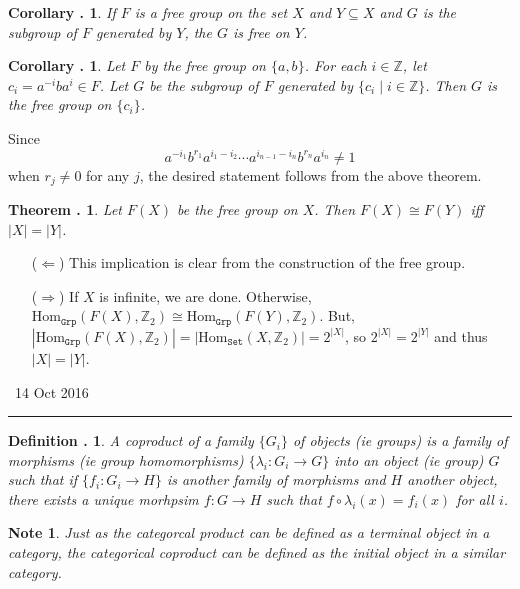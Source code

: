\documentclass[twoside]{report}
\newcommand{\Hom}{\textrm{Hom}}
\newcommand{\Z}{\mathbb{Z}}
\newcommand{\cat}[1]{\texttt{#1}}
\newcounter{Lecture}
\newcommand{\newLec}[1]{
  \stepcounter{Lecture}
  \noindent{\Large\bf Lecture \arabic{Lecture}} \, #1 \hfill  \rule[1ex]{2.5in}{.1pt} \vspace{1em}
}
\theoremstyle{myts}
\newcounter{c}[Lecture]
\newtheorem{dfn}[c]{Definition \arabic{Lecture}.}
\newtheorem{thm}[c]{Theorem \arabic{Lecture}.}
\newtheorem{cor}[c]{Corollary \arabic{Lecture}.}
\newtheorem*{nte}{Note}
\newcounter{ex}
\newenvironment{prf}{
  \noindent\begin{mdframed}[style=prf]}{\end{mdframed} \vspace{1em}
}
\begin{document}
\begin{cor}
  If $F$ is a free group on the set $X$ and $Y\subseteq X$ and $G$ is the subgroup of $F$ generated by $Y$, the $G$ is free on $Y$.
\end{cor}

\begin{cor}
  Let $F$ by the free group on \( \{a,b\} \). For each $i\in\Z$, let \( c_i = a^{-i} b a^i \in F \). Let $G$ be the subgroup of $F$ generated by \( \{ c_i \; | \; i\in\Z \} \). Then $G$ is the free group on \( \{ c_i \} \).
\end{cor}

\begin{prf}
  Since
  \[
    a^{-i_1} b^{r_1} a^{i_1-i_2} \cdots a^{i_{n-1}-i_n} b^{r_n} a^{i_n} \neq 1
  \]
  when $r_j\neq 0$ for any $j$, the desired statement follows from the above theorem. 
\end{prf}

\begin{thm}
  Let $F(X)$ be the free group on $X$. Then \( F(X) \cong F(Y) \) iff \( |X| = |Y| \).
\end{thm}

\begin{prf}
  \begin{itemize}
    \item[($\Leftarrow$)] This implication is clear from the construction of the free group.
    \item[($\Rightarrow$)] If $X$ is infinite, we are done. Otherwise, \( \Hom_{\cat{Grp}}(F(X),\Z_2) \cong \Hom_{\cat{Grp}}(F(Y),\Z_2)\). But, \( |\Hom_{\cat{Grp}}(F(X), \Z_2) | = | \Hom_{\cat{Set}} (X, \Z_2) | = 2^{|X|} \), so \(2^{|X|} = 2^{|Y|} \) and thus $|X|=|Y|$.
  \end{itemize}
\end{prf}

\newLec{14 Oct 2016}

\begin{dfn}
  A \emph{coproduct} of a family \( \{ G_i \} \) of objects (ie groups) is a family of morphisms (ie group homomorphisms) \( \{ \lambda_i : G_i \to G \} \) into an object (ie group) $G$ such that if \( \{ f_i : G_i \to H \} \) is another family of morphisms and $H$ another object, there exists a unique morhpsim \( f : G \to H \) such that \( f \circ \lambda_i (x) = f_i (x) \) for all $i$.
\end{dfn}

\begin{nte}
  Just as the categorcal product can be defined as a terminal object in a category, the categorical coproduct can be defined as the initial object in a similar category.
\end{nte}
\end{document}
